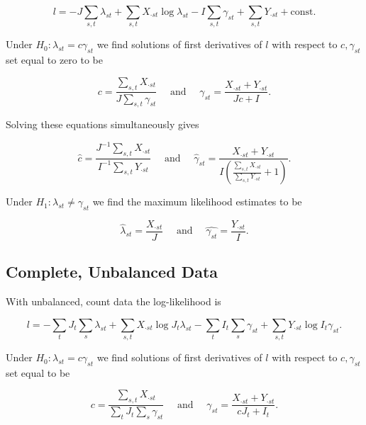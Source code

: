 \documentclass[12pt]{article}\usepackage[]{graphicx}\usepackage[]{color}
\begin{document}
\begin{equation*}
  l = -J\sum_{s,t} \lambda_{st} + \sum_{s,t}X_{\cdot st}\log{\lambda_{st}} - I \sum_{s,t}\gamma_{st} + \sum_{s,t}Y_{\cdot st} + \text{const}.
\end{equation*}

Under $H_0: \lambda_{st} = c \gamma_{st}$ we find solutions of first derivatives of $l$ with respect to $c, \gamma_{st}$ set equal to zero to be

\begin{equation*}
  c = \frac{\sum_{s,t} X_{\cdot st}}{J\sum_{s,t} \gamma_{st}} \quad \text{ and } \quad \gamma_{st} = \frac{X_{\cdot st} + Y_{\cdot st}}{Jc + I}.
\end{equation*}

\noindent Solving these equations simultaneously gives

\begin{equation*}
  \hat{c} = \frac{J^{-1} \sum_{s,t} X_{\cdot st}}{I^{-1} \sum_{s,t} Y_{\cdot st}} \quad \text{ and } \quad \hat{\gamma}_{st} = \frac{X_{\cdot st} + Y_{\cdot st}}{I\left( \frac{\sum_{s,t}X_{\cdot st}}{\sum_{s,t} Y_{\cdot st}} + 1  \right)}.
\end{equation*}

Under $H_1: \lambda_{st} \ne \gamma_{st}$ we find the maximum likelihood estimates to be

\begin{equation*}
  \hat{\lambda}_{st} = \frac{X_{\cdot st}}{J} \quad \text{ and } \quad \hat{\gamma_{st}} = \frac{Y_{\cdot st}}{I}.
\end{equation*}

\subsection{Complete, Unbalanced Data}

With unbalanced, count data the log-likelihood is

\begin{equation*}
  l = -\sum_{t} J_t \sum_{s} \lambda_{st} + \sum_{s,t} X_{\cdot st} \log{J_t \lambda_{st}} - \sum_{t} I_t \sum_{s} \gamma_{st} + \sum_{s,t} Y_{\cdot st} \log{I_t \gamma_{st}}.
\end{equation*}

Under $H_0: \lambda_{st} = c \gamma_{st}$ we find solutions of first derivatives of $l$ with respect to $c, \gamma_{st}$ set equal to be

\begin{equation*}
  c = \frac{\sum_{s,t} X_{\cdot st}}{\sum_{t} J_t \sum_{s} \gamma_{st}} \quad \text{ and } \quad \gamma_{st} = \frac{X_{\cdot st} + Y_{\cdot st}}{cJ_{t} + I_{t}}.
\end{equation*}
\end{document}
